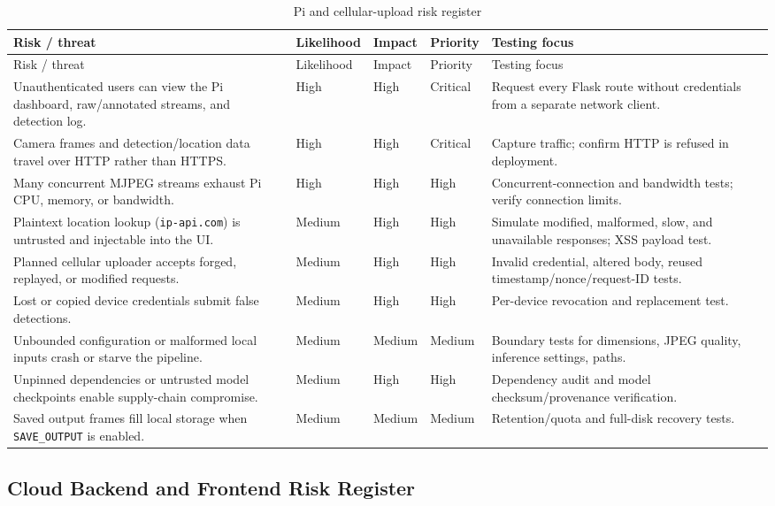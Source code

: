 \documentclass[12pt]{article}
\newcommand{\toprule}{\hline}
\newcommand{\midrule}{\hline}
\newcommand{\bottomrule}{\hline}
\begin{document}
\begin{longtable}{p{}p{}p{}p{}p{}}
\caption{Pi and cellular-upload risk register}\label{tab:risks}\\
\toprule
Risk / threat & Likelihood & Impact & Priority & Testing focus \\
\midrule
\endfirsthead
\toprule
Risk / threat & Likelihood & Impact & Priority & Testing focus \\
\midrule
\endhead
Unauthenticated users can view the Pi dashboard, raw/annotated streams, and detection log. & High & High & Critical & Request every Flask route without credentials from a separate network client. \\
Camera frames and detection/location data travel over HTTP rather than HTTPS. & High & High & Critical & Capture traffic; confirm HTTP is refused in deployment. \\
Many concurrent MJPEG streams exhaust Pi CPU, memory, or bandwidth. & High & High & High & Concurrent-connection and bandwidth tests; verify connection limits. \\
Plaintext location lookup (\texttt{ip-api.com}) is untrusted and injectable into the UI. & Medium & High & High & Simulate modified, malformed, slow, and unavailable responses; XSS payload test. \\
Planned cellular uploader accepts forged, replayed, or modified requests. & Medium & High & High & Invalid credential, altered body, reused timestamp/nonce/request-ID tests. \\
Lost or copied device credentials submit false detections. & Medium & High & High & Per-device revocation and replacement test. \\
Unbounded configuration or malformed local inputs crash or starve the pipeline. & Medium & Medium & Medium & Boundary tests for dimensions, JPEG quality, inference settings, paths. \\
Unpinned dependencies or untrusted model checkpoints enable supply-chain compromise. & Medium & High & High & Dependency audit and model checksum/provenance verification. \\
Saved output frames fill local storage when \texttt{SAVE\_OUTPUT} is enabled. & Medium & Medium & Medium & Retention/quota and full-disk recovery tests. \\
\bottomrule
\end{longtable}

\subsection{Cloud Backend and Frontend Risk Register}
\end{document}
